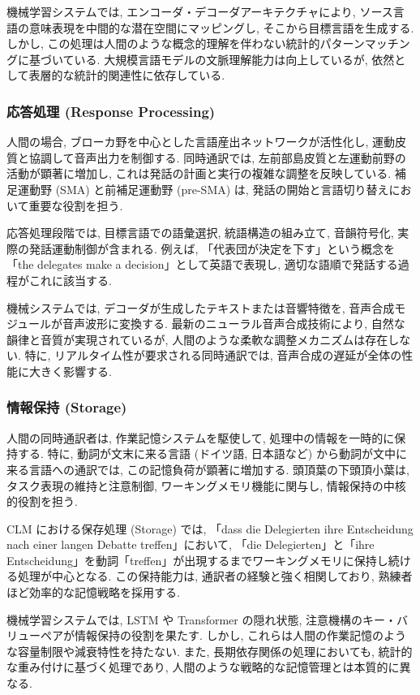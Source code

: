 機械学習システムでは, エンコーダ・デコーダアーキテクチャにより, ソース言語の意味表現を中間的な潜在空間にマッピングし, そこから目標言語を生成する.
しかし, この処理は人間のような概念的理解を伴わない統計的パターンマッチングに基づいている.
大規模言語モデルの文脈理解能力は向上しているが, 依然として表層的な統計的関連性に依存している.

\subsubsection{応答処理 (Response Processing)}

人間の場合, ブローカ野を中心とした言語産出ネットワークが活性化し, 運動皮質と協調して音声出力を制御する.
同時通訳では, 左前部島皮質と左運動前野の活動が顕著に増加し, これは発話の計画と実行の複雑な調整を反映している.
補足運動野 (SMA) と前補足運動野 (pre-SMA) は, 発話の開始と言語切り替えにおいて重要な役割を担う.

応答処理段階では, 目標言語での語彙選択, 統語構造の組み立て, 音韻符号化, 実際の発話運動制御が含まれる.
例えば, 「代表団が決定を下す」という概念を「the delegates make a decision」として英語で表現し, 適切な語順で発話する過程がこれに該当する.

機械システムでは, デコーダが生成したテキストまたは音響特徴を, 音声合成モジュールが音声波形に変換する.
最新のニューラル音声合成技術により, 自然な韻律と音質が実現されているが, 人間のような柔軟な調整メカニズムは存在しない.
特に, リアルタイム性が要求される同時通訳では, 音声合成の遅延が全体の性能に大きく影響する.

\subsubsection{情報保持 (Storage)}

人間の同時通訳者は, 作業記憶システムを駆使して, 処理中の情報を一時的に保持する.
特に, 動詞が文末に来る言語 (ドイツ語, 日本語など) から動詞が文中に来る言語への通訳では, この記憶負荷が顕著に増加する.
頭頂葉の下頭頂小葉は, タスク表現の維持と注意制御, ワーキングメモリ機能に関与し, 情報保持の中核的役割を担う.

CLM における保存処理 (Storage) では, 「dass die Delegierten ihre Entscheidung nach einer langen Debatte treffen」において, 「die Delegierten」と「ihre Entscheidung」を動詞「treffen」が出現するまでワーキングメモリに保持し続ける処理が中心となる.
この保持能力は, 通訳者の経験と強く相関しており, 熟練者ほど効率的な記憶戦略を採用する.

機械学習システムでは, LSTM や Transformer の隠れ状態, 注意機構のキー・バリューペアが情報保持の役割を果たす.
しかし, これらは人間の作業記憶のような容量制限や減衰特性を持たない.
また, 長期依存関係の処理においても, 統計的な重み付けに基づく処理であり, 人間のような戦略的な記憶管理とは本質的に異なる.

